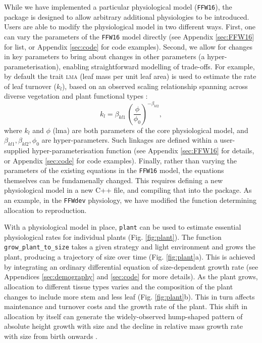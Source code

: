 \documentclass[a4paper,11pt]{article}
\newcommand{\plant}{\texttt{plant}}
\begin{document}
While we have implemented a particular physiological model
(\texttt{FFW16}), the package is designed to allow arbitrary
additional physiologies to be introduced. Users are able to modify the
physiological model in two different ways. First, one can vary the
parameters of the \texttt{FFW16} model directly (see Appendix
\ref{sec:FFW16} for list, or Appendix \ref{sec:code} for code
examples). Second, we allow for changes in key parameters to bring
about changes in other parameters (a hyper-parameterisation), enabling
straightforward modelling of trade-offs. For example, by default the
trait \textsc{lma} (leaf mass per unit leaf area) is used to estimate
the rate of leaf turnover ($k_l$), based on an observed scaling
relationship spanning across diverse vegetation and plant functional
types \citep{Wright-2004}:
$$k_l = \beta_{kl1} \, \left(\frac{\phi}{\phi_0}\right)^{-\beta_{kl2}},$$
where $k_l$ and $\phi$ (lma) are both parameters of the core physiological
model, and $\beta_{kl1}, \beta_{kl2}, \phi_0$ are hyper-parameters. Such
linkages are defined within a user-supplied hyper-parameterisation function
(see Appendix \ref{sec:FFW16} for details, or Appendix
\ref{sec:code} for code examples).
%
Finally, rather than varying the parameters of the existing equations
in the \texttt{FFW16} model, the equations themselves can be
fundamenally changed.  This requires defining a new physiological
model in a new C++ file, and compiling that into the package.  As an
example, in the \texttt{FFWdev} physiology, we have modified the
function determining allocation to reproduction.

With a physiological model in place, {\plant} can be used to estimate
essential physiological rates for individual plants
(Fig. \ref{fig:plant}). The function \texttt{grow\_plant\_to\_size}
takes a given strategy and light environment and grows the plant,
producing a trajectory of size over time (Fig. \ref{fig:plant}a). This
is achieved by integrating an ordinary differential equation of
size-dependent growth rate (see Appendices \ref{sec:demography} and
\ref{sec:code} for more details). As the plant grows, allocation to
different tissue types varies and the composition of the plant
changes to include more stem and less leaf
(Fig. \ref{fig:plant}b). This in turn affects maintenance and turnover
costs and the growth rate of the plant.  This
shift in allocation by itself can generate the widely-observed hump-shaped pattern
of absolute height growth with size \citep[Fig. \ref{fig:plant}c;][]{King-2011} and the decline in relative mass growth rate with size from birth onwards \citep{Enquist-2007}.
\end{document}
